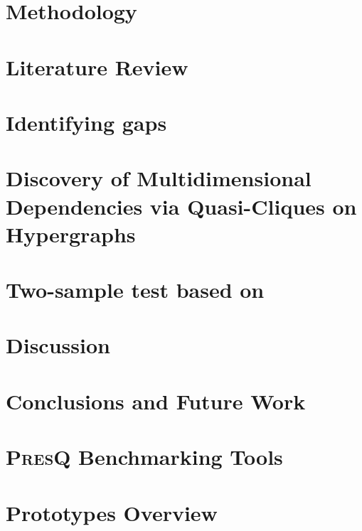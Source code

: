 \documentclass[12pt]{book}
\newcommand{\PresQ}[0]{\textsc{PresQ}\xspace}
\begin{document}
\chapter{Methodology}
\label{chapter:methodology}


\chapter{Literature Review}
\label{chapter:literature_review}


\chapter{Identifying gaps}
\label{chapter:diverse}


\chapter{Discovery of Multidimensional Dependencies via Quasi-Cliques on Hypergraphs}
\label{chapter:presq}


\chapter{Two-sample test based on }
\label{chapter:som}


\chapter{Discussion}
\label{chapter:discussion}


\chapter{Conclusions and Future Work}
\label{chapter:conclusions}


\printbibliography[heading=bibintoc,segment=0]

\appendix
\newrefsegment

\chapter{\PresQ Benchmarking Tools}
\label{appendix:presq_benchmarks}


\chapter{Prototypes Overview}
\label{appendix:prototypes}


\printbibliography[segment=1]
\end{document}
